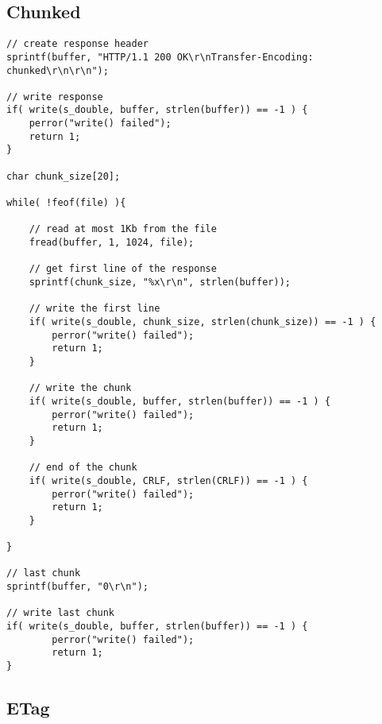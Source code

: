 \newpage\subsection{Chunked}

\begin{lstlisting}
// create response header
sprintf(buffer, "HTTP/1.1 200 OK\r\nTransfer-Encoding: chunked\r\n\r\n");

// write response
if( write(s_double, buffer, strlen(buffer)) == -1 ) {
    perror("write() failed");
    return 1;
}

char chunk_size[20];

while( !feof(file) ){
    
    // read at most 1Kb from the file
    fread(buffer, 1, 1024, file);

    // get first line of the response
    sprintf(chunk_size, "%x\r\n", strlen(buffer));

    // write the first line
    if( write(s_double, chunk_size, strlen(chunk_size)) == -1 ) {
        perror("write() failed");
        return 1;
    }

    // write the chunk
    if( write(s_double, buffer, strlen(buffer)) == -1 ) {
        perror("write() failed");
        return 1;
    }

    // end of the chunk
    if( write(s_double, CRLF, strlen(CRLF)) == -1 ) {
        perror("write() failed");
        return 1;
    }

}

// last chunk
sprintf(buffer, "0\r\n");

// write last chunk
if( write(s_double, buffer, strlen(buffer)) == -1 ) {
        perror("write() failed");
        return 1;
}
\end{lstlisting}


\newpage\subsection{ETag}

